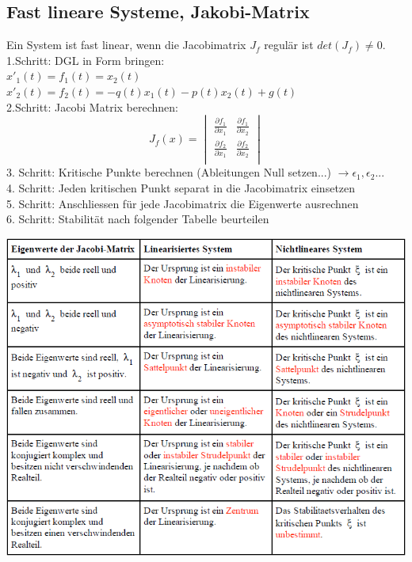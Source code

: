 \subsection{Fast lineare Systeme, Jakobi-Matrix}
Ein System ist fast linear, wenn die Jacobimatrix $J_f$ regulär ist $det(J_f)\neq 0$. \\
1.Schritt: DGL in Form bringen:\\ 
$x'_1(t) = f_1(t) = x_2(t)$\\
$x'_2(t) = f_2(t) = -q(t)x_1(t)-p(t)x_2(t)+g(t)$\\
2.Schritt: Jacobi Matrix berechnen:\\
\begin{equation*}
	J_f(x) =    
	\begin{vmatrix} 
	        \frac{\partial f_1}{\partial x_1} & \frac{\partial f_1}{\partial x_2}\\ 
	        \frac{\partial f_2}{\partial x_1} & \frac{\partial f_2}{\partial x_2}\\   
	\end{vmatrix}
\end{equation*}
3. Schritt: Kritische Punkte berechnen (Ableitungen Null setzen...) $\rightarrow \epsilon_1, \epsilon_2...$\\
4. Schritt: Jeden kritischen Punkt separat in die Jacobimatrix einsetzen\\
5. Schritt: Anschliessen für jede Jacobimatrix die Eigenwerte ausrechnen \\
6. Schritt: Stabilität nach folgender Tabelle beurteilen\\
\begin{minipage}[h]{0.7\textwidth}
	\includegraphics[width=1.0\textwidth]{images/JacobiTabelle.png}
\end{minipage}

